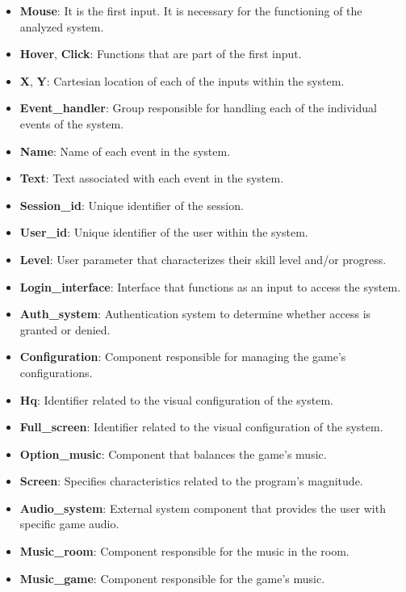 \documentclass{article}
\begin{document}
\begin{itemize}[leftmargin=*]
    \item \textbf{\textbf{Mouse}}: It is the first input. It is necessary for the functioning of the analyzed system.
    \item \textbf{\textbf{Hover}}, \textbf{\textbf{Click}}: Functions that are part of the first input.
    \item \textbf{\textbf{X}}, \textbf{\textbf{Y}}: Cartesian location of each of the inputs within the system.
    \item \textbf{\textbf{Event\_handler}}: Group responsible for handling each of the individual events of the system.
    \item \textbf{\textbf{Name}}: Name of each event in the system.
    \item \textbf{\textbf{Text}}: Text associated with each event in the system.
    \item \textbf{\textbf{Session\_id}}: Unique identifier of the session.
    \item \textbf{\textbf{User\_id}}: Unique identifier of the user within the system.
    \item \textbf{\textbf{Level}}: User parameter that characterizes their skill level and/or progress.
    \item \textbf{\textbf{Login\_interface}}: Interface that functions as an input to access the system.
    \item \textbf{\textbf{Auth\_system}}: Authentication system to determine whether access is granted or denied.
    \item \textbf{\textbf{Configuration}}: Component responsible for managing the game's configurations.
    \item \textbf{\textbf{Hq}}: Identifier related to the visual configuration of the system.
    \item \textbf{\textbf{Full\_screen}}: Identifier related to the visual configuration of the system.
    \item \textbf{\textbf{Option\_music}}: Component that balances the game’s music.
    \item \textbf{\textbf{Screen}}: Specifies characteristics related to the program’s magnitude.
    \item \textbf{\textbf{Audio\_system}}: External system component that provides the user with specific game audio.
    \item \textbf{\textbf{Music\_room}}: Component responsible for the music in the room.
    \item \textbf{\textbf{Music\_game}}: Component responsible for the game’s music.

\end{itemize}
\end{document}
